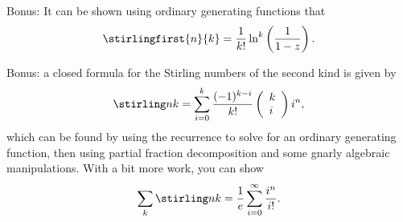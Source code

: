 Bonus: It can be shown using ordinary generating functions that \[
\stirlingfirst{n}{k} = \frac { 1 } { k ! } \ln ^ { k } \left( \frac { 1 } { 1 - z } \right).
\]

Bonus: a closed formula for the Stirling numbers of the second kind is
given by \[
\stirling n k = \sum _ { i = 0 } ^ { k } \frac { ( - 1 ) ^ { k - i } } { k ! } \left( \begin{array} { l } { k } \\ { i } \end{array} \right) i ^ { n },
\] which can be found by using the recurrence to solve for an ordinary
generating function, then using partial fraction decomposition and some
gnarly algebraic manipulations. With a bit more work, you can show \[
\sum_k \stirling n k = \frac 1 e \sum_{i=0}^\infty \frac{i^n}{i!}.
\]





